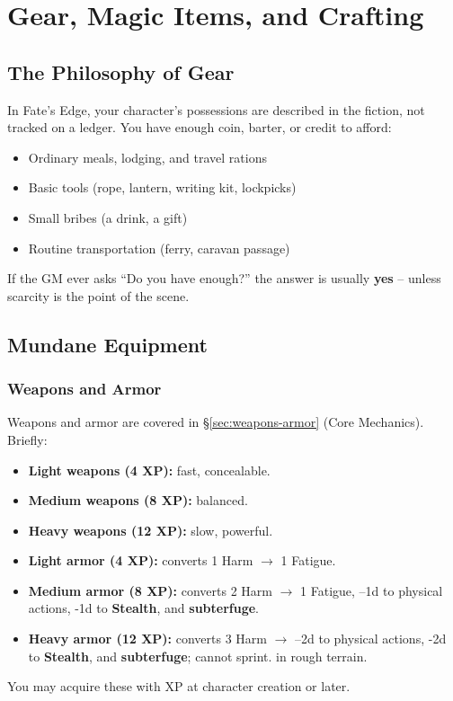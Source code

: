 \chapter{Gear, Magic Items, and Crafting}
\label{ch:gear}

\section{The Philosophy of Gear}
In Fate's Edge, your character's possessions are described in the fiction, not tracked on a ledger. You have enough coin, barter, or credit to afford:
\begin{itemize}
  \item Ordinary meals, lodging, and travel rations
  \item Basic tools (rope, lantern, writing kit, lockpicks)
  \item Small bribes (a drink, a gift)
  \item Routine transportation (ferry, caravan passage)
\end{itemize}
If the GM ever asks ``Do you have enough?'' the answer is usually \textbf{yes} -- unless scarcity is the point of the scene.

\section{Mundane Equipment}
\label{sec:mundane-gear}

\subsection{Weapons and Armor}
Weapons and armor are covered in \S\ref{sec:weapons-armor} (Core Mechanics). Briefly:
\begin{itemize}
  \item \textbf{Light weapons (4 XP):} fast, concealable.
  \item \textbf{Medium weapons (8 XP):} balanced.
  \item \textbf{Heavy weapons (12 XP):} slow, powerful.
  \item \textbf{Light armor (4 XP):} converts 1 Harm $\rightarrow$ 1 Fatigue.
  \item \textbf{Medium armor (8 XP):} converts 2 Harm $\rightarrow$ 1 Fatigue, --1d to physical actions, -1d to \textbf{Stealth}, and \textbf{subterfuge}.
  \item \textbf{Heavy armor (12 XP):} converts 3 Harm $\rightarrow$ --2d to physical actions, -2d to \textbf{Stealth}, and \textbf{subterfuge}; cannot sprint. in rough terrain.
\end{itemize}
You may acquire these with XP at character creation or later.

